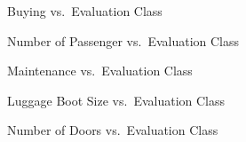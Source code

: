 \documentclass[
  letterpaper,
  DIV=11,
  numbers=noendperiod]{scrartcl}
\begin{document}
\begin{figure}


\caption{\label{fig-car_buying_plot}Buying vs.~Evaluation Class}

\end{figure}%

\begin{figure}


\caption{\label{fig-car_persons_plot}Number of Passenger vs.~Evaluation
Class}

\end{figure}%

\begin{figure}


\caption{\label{fig-car_maintenance_plot}Maintenance vs.~Evaluation
Class}

\end{figure}%

\begin{figure}


\caption{\label{fig-car_luggage_plot}Luggage Boot Size vs.~Evaluation
Class}

\end{figure}%

\begin{figure}


\caption{\label{fig-car_doors_plot}Number of Doors vs.~Evaluation Class}

\end{figure}%
\end{document}
